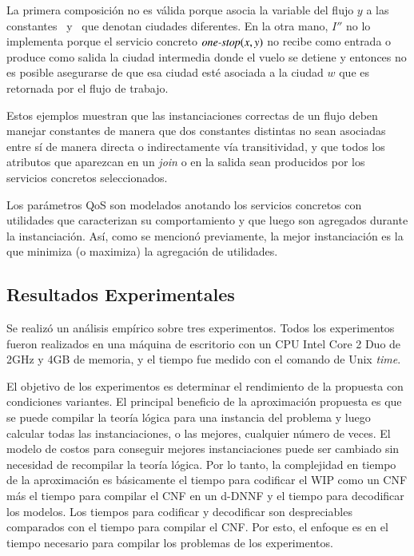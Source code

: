 La primera composición no es válida porque asocia la variable del flujo $y$ a
las constantes \PA\ y \NY\ que denotan ciudades diferentes. En la otra mano, $I''$
no lo implementa porque el servicio concreto $\text{\it one-stop}(x,y)$ no recibe como entrada
o produce como salida la ciudad intermedia donde el vuelo se detiene y entonces
no es posible asegurarse de que esa ciudad esté asociada a la ciudad $w$ que es
retornada por el flujo de trabajo.

Estos ejemplos muestran que las instanciaciones correctas de un flujo deben
manejar constantes de manera que dos constantes distintas no sean asociadas
entre sí de manera directa o indirectamente vía transitividad, y que todos los
atributos que aparezcan en un \emph{join} o en la salida sean producidos por los
servicios concretos seleccionados.

Los parámetros QoS son modelados anotando los servicios concretos con utilidades
que caracterizan su comportamiento y que luego son agregados durante la
instanciación. Así, como se mencionó previamente, la mejor instanciación es la
que minimiza (o maximiza) la agregación de utilidades.

\subsection{Resultados Experimentales}

Se realizó un análisis empírico sobre tres experimentos. Todos los experimentos
fueron realizados en una máquina de escritorio con un CPU Intel Core 2 Duo de
2GHz y 4GB de memoria, y el tiempo fue medido con el comando de Unix
\emph{time}.

El objetivo de los experimentos es determinar el rendimiento de la propuesta con
condiciones variantes. El principal beneficio de la aproximación propuesta es
que se puede compilar la teoría lógica para una instancia del problema y luego
calcular todas las instanciaciones, o las mejores, cualquier número de veces. El
modelo de costos para conseguir mejores instanciaciones puede ser cambiado sin
necesidad de recompilar la teoría lógica. Por lo tanto, la complejidad en tiempo
de la aproximación es básicamente el tiempo para codificar el WIP como un
CNF más el tiempo para compilar el CNF en un d-DNNF y el tiempo para decodificar
los modelos. Los tiempos para codificar y decodificar son despreciables
comparados con el tiempo para compilar el CNF. Por esto, el enfoque es en el tiempo
necesario para compilar los problemas de los experimentos.

